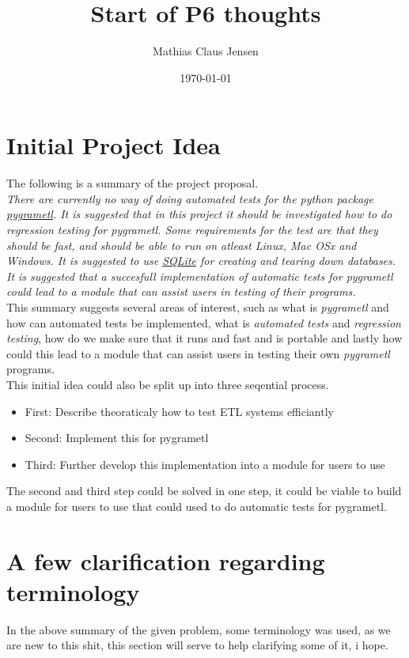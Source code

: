\documentclass[a4paper,12pt]{article}
\title{Start of P6 thoughts}
\author{Mathias Claus Jensen}
\date{\today}
\begin{document}
\maketitle

\section{Initial Project Idea}
The following is a summary of the project proposal. \\

\emph{There are currently no way of doing automated tests for the python package \href{http://pygrametl.org}{\textit{pygrametl}}. It is suggested that in this project it should be investigated how to do regression testing for \textit{pygrametl}. Some requirements for the test are that they should be fast, and should be able to run on atleast Linux, Mac OSx and Windows. It is suggested to use \href{http://sqlite.org}{SQLite} for creating and tearing down databases. It is suggested that a succesfull implementation of automatic tests for \textit{pygrametl} could lead to a module that can assist users in  testing of their programs.} \\

This summary  suggests several areas of interest, such as what is \textit{pygrametl} and how can automated tests be implemented, what is \textit{automated tests} and \textit{regression testing}, how do we make sure that it runs and fast and is portable and lastly how could this lead to a module that can assist users in testing their own \textit{pygrametl} programs. \\

This initial idea could also be split up into three seqential process.
\begin{itemize}
\item First: Describe theoraticaly how to test ETL systems efficiantly
\item Second: Implement this for pygrametl
\item Third: Further develop this implementation into a module for users to use
\end{itemize}

The second and third step could be solved in one step, it could be viable to build a module for users to use that could used to do automatic tests for pygrametl.


\section{A few clarification regarding terminology}
In the above summary of the given problem, some terminology was used, as we are new to this shit, this section will serve to help clarifying some of it, i hope.
\end{document}
